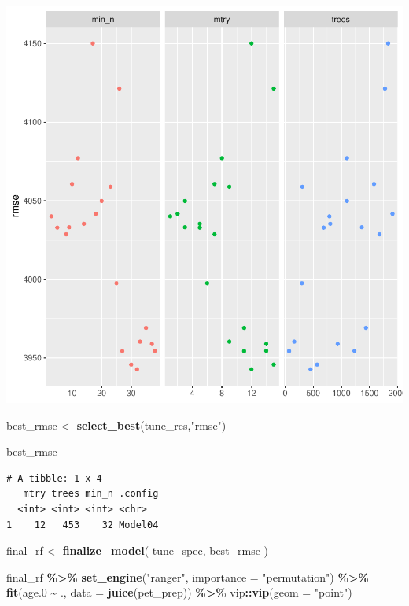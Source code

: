 \documentclass[
]{article}
\newenvironment{Shaded}{\begin{snugshade}}{\end{snugshade}}
\newcommand{\DataTypeTok}[1]{\textcolor[rgb]{0.13,0.29,0.53}{#1}}
\newcommand{\FloatTok}[1]{\textcolor[rgb]{0.00,0.00,0.81}{#1}}
\newcommand{\KeywordTok}[1]{\textcolor[rgb]{0.13,0.29,0.53}{\textbf{#1}}}
\newcommand{\NormalTok}[1]{#1}
\newcommand{\OperatorTok}[1]{\textcolor[rgb]{0.81,0.36,0.00}{\textbf{#1}}}
\newcommand{\StringTok}[1]{\textcolor[rgb]{0.31,0.60,0.02}{#1}}
\begin{document}
\includegraphics{calcurr_files/figure-latex/unnamed-chunk-13-1.pdf}

\begin{Shaded}
\begin{Highlighting}[]
\NormalTok{best\_rmse <{-}}\StringTok{ }\KeywordTok{select\_best}\NormalTok{(tune\_res,}\StringTok{"rmse"}\NormalTok{)}

\NormalTok{best\_rmse}
\end{Highlighting}
\end{Shaded}

\begin{verbatim}
# A tibble: 1 x 4
   mtry trees min_n .config
  <int> <int> <int> <chr>  
1    12   453    32 Model04
\end{verbatim}

\begin{Shaded}
\begin{Highlighting}[]
\NormalTok{final\_rf <{-}}\StringTok{ }\KeywordTok{finalize\_model}\NormalTok{(}
\NormalTok{  tune\_spec,}
\NormalTok{  best\_rmse}
\NormalTok{)}

\NormalTok{final\_rf }\OperatorTok{\%>\%}
\StringTok{  }\KeywordTok{set\_engine}\NormalTok{(}\StringTok{"ranger"}\NormalTok{, }\DataTypeTok{importance =} \StringTok{"permutation"}\NormalTok{) }\OperatorTok{\%>\%}
\StringTok{  }\KeywordTok{fit}\NormalTok{(age}\FloatTok{.0} \OperatorTok{\textasciitilde{}}\StringTok{ }\NormalTok{.,}
    \DataTypeTok{data =} \KeywordTok{juice}\NormalTok{(pet\_prep)) }\OperatorTok{\%>\%}
\StringTok{  }\NormalTok{vip}\OperatorTok{::}\KeywordTok{vip}\NormalTok{(}\DataTypeTok{geom =} \StringTok{"point"}\NormalTok{)}
\end{Highlighting}
\end{Shaded}
\end{document}
